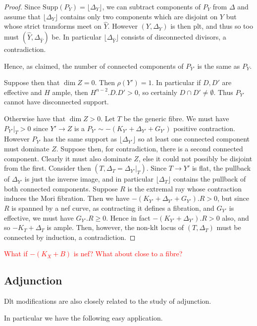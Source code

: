 \documentclass[a4paper,12pt]{book}
\newcommand{\D}{\Delta}
\newcommand\myworries[1]{\textcolor{red}{#1}}
\begin{document}
\begin{proof}
	Since $\text{Supp}(P_{Y})=\lfloor \D_{Y} \rfloor$, we can subtract components of $P_{Y}$ from $\Delta$ and assume that $\lfloor \D_{Y} \rfloor$ contains only two components which are disjoint on $Y$ but whose strict transforms meet on $\hat{Y}$. However $(Y,\Delta_{Y})$ is then plt, and thus so too must $(\hat{Y},\D_{\hat{Y}})$ be. In particular $\lfloor \D_{\hat{Y}} \rfloor$ consists of disconnected divisors, a contradiction.

	Hence, as claimed, the number of connected components of $P_{Y'}$ is the same as $P_{Y}$.
	
	Suppose then that $\dim Z=0$. Then $\rho(Y')=1$. In particular if $D,D'$ are effective and $H$ ample, then $H^{n-2}.D.D' >0$, so certainly $D\cap D' \neq \emptyset$. Thus $P_{Y'}$ cannot have disconnected support.
	
	Otherwise have that $\dim Z > 0 $. Let $T$ be the generic fibre. We must have $P_{Y'}|_{T}> 0$ since $Y' \to Z$ is a $P_{Y'}\sim -(K_{Y'}+\Delta_{Y'}+G_{Y'})$ positive contraction. However $P_{Y'}$ has the same support as $\lfloor \D_{Y'} \rfloor$ so at least one connected component must dominate $Z$. Suppose then, for contradiction, there is a second connected component. Clearly it must also dominate $Z$, else it could not possibly be disjoint from the first. Consider then $(T,\D_{T}=\D_{Y'}|_{T})$. Since $T \to Y'$ is flat, the pullback of $\D_{Y'}$ is just the inverse image, and in particular $\lfloor \D_{T} \rfloor$ contains the pullback of both connected components. Suppose $R$ is the extremal ray whose contraction induces the Mori fibration. Then we have $-(K_{Y'}+\D_{Y'}+G_{Y'}).R >0$, but since $R$ is spanned by a nef curve, as contracting it defines a fibration, and $G_{Y'}$ is effective, we must have $G_{Y'}.R \geq 0$. Hence in fact $-(K_{Y'}+\D_{Y'}).R >0$ also, and so $-K_{T}+\D_{T}$ is ample. Then, however, the non-klt locus of $(T,\D_{T})$ must be connected by induction, a contradiction.
\end{proof}

\myworries{What if $-(K_{X}+B)$ is nef? What about close to a fibre?}

\subsection{Adjunction}

Dlt modifications are also closely related to the study of adjunction.

In particular we have the following easy application.
\end{document}
